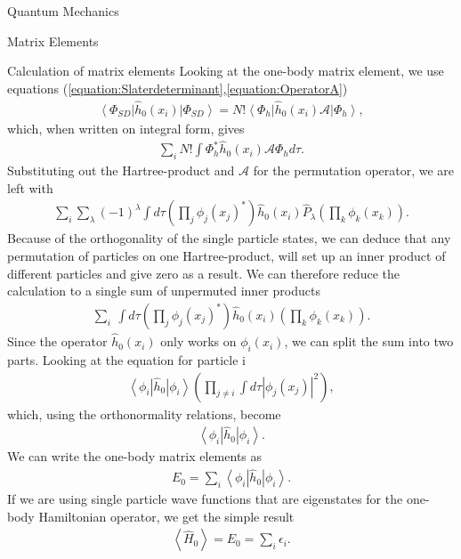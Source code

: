 \documentclass[twoside,english]{uiofysmaster}
\begin{document}
\begin{chapter}{Quantum Mechanics}
\begin{section}{Matrix Elements}
		\begin{subsection}{Calculation of matrix elements}
			Looking at the one-body matrix element, we use
                        equations
                        (\ref{equation:Slaterdeterminant},\ref{equation:OperatorA})
			\begin{align}
				\left< \Phi_{SD} \right| \hat h_0(x_i) \left| \Phi_{SD} \right> = N! \left< \Phi_h \right| \hat h_0(x_i) \mathcal{A} \left| \Phi_h \right>, 
			\end{align}
			which, when written  on integral form, gives
			\begin{align}
				\sum_i N! \int \Phi_h^* \hat h_0(x_i) \mathcal{A} \Phi_h d\tau .
			\end{align}
			Substituting out the Hartree-product and $\mathcal{A}$ for the permutation operator, we are left with
			\begin{align}
				\sum_i \sum_\lambda (-1)^\lambda \int d\tau \left( \prod_j \phi_j(x_j)^* \right) \hat h_0(x_i) \hat P_\lambda \left( \prod_k \phi_k(x_k) \right).
			\end{align}
			Because of the orthogonality of the single particle states, we can deduce that any permutation of particles on one Hartree-product, will set up an inner product of different particles and give zero as a result. We can therefore reduce the calculation to a single sum of unpermuted inner products
			\begin{align}
				\sum_i \ \int d\tau \left( \prod_j \phi_j(x_j)^* \right) \hat h_0(x_i) \left( \prod_k \phi_k(x_k) \right).
			\end{align}
			Since the operator $\hat h_0(x_i)$ only works on $\phi_i(x_i)$, we can split the sum into two parts. Looking at the equation for particle i
			\begin{align}
				\left< \phi_i \right| \hat h_0 \left| \phi_i \right>  \left( \prod_{j \neq i} \int d\tau \left| \phi_j(x_j) \right|^2 \right),
			\end{align}
			which, using the orthonormality relations, become
			\begin{align}
				\left< \phi_i \right| \hat h_0 \left| \phi_i \right>.
			\end{align}
			We can write the one-body matrix elements as
			\begin{align}
				E_0 = \sum_i \left< \phi_i \right| \hat h_0 \left| \phi_i \right>.
			\end{align}
			If we are using single particle wave functions that are eigenstates for the one-body Hamiltonian operator, we get the simple result
			\begin{align}
				\left< \right. \hat H_0 \left. \right> = E_0 = \sum_i \epsilon_i.
			\end{align}


\end{subsection}
\end{section}
\end{chapter}
\end{document}
